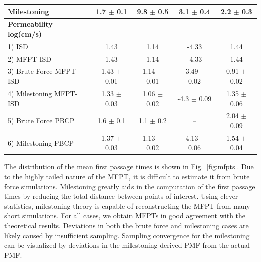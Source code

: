 \begin{table}[!htbp]
\begin{sideways}
\begin{tabular}{@{}lcccc@{}}
    Milestoning             & 1.7 $\pm$ 0.1\e{-2}           & 9.8 $\pm$ 0.5\e{-3}
                                    & 3.1 $\pm$ 0.4\e{-8}            & 2.2 $\pm$ 0.3\e{-2}     \\
    \bottomrule
    \textbf{Permeability log(cm/s)} & & & & \\\midrule
    1) ISD                  & 1.43            & 1.14             & -4.33            & 1.44           \\
    2) MFPT-ISD             & 1.43            & 1.14             & -4.33            & 1.44           \\
    3) Brute Force MFPT-ISD & 1.43 $\pm$ 0.01 & 1.14 $\pm$ 0.01  & -3.49 $\pm$ 0.02 & 0.91 $\pm$ 0.02\\
    4) Milestoning MFPT-ISD & 1.33 $\pm$ 0.03 & 1.06 $\pm$ 0.02  & -4.3 $\pm$ 0.09  & 1.35 $\pm$ 0.06\\
    5) Brute Force PBCP     & 1.6 $\pm$ 0.1   & 1.1 $\pm$ 0.2    & --               & 2.04 $\pm$ 0.09\\
    6) Milestoning PBCP     & 1.37 $\pm$ 0.03 & 1.13 $\pm$ 0.02  & -4.13 $\pm$ 0.06 & 1.54 $\pm$ 0.04\\
    \bottomrule
    \end{tabular}
\end{sideways}
\label{table:milepermresults}
\end{table}

    \par The distribution of the mean first passage times is shown in Fig.~\ref{fig:mfpts}. Due to the highly tailed nature of the MFPT, it is difficult to estimate it from brute force simulations. Milestoning greatly aids in the computation of the first passage times by reducing the total distance between points of interest. Using clever statistics, milestoning theory is capable of reconstructing the MFPT from many short simulations. For all cases, we obtain MFPTs in good agreement with the theoretical results. Deviations in both the brute force and milestoning cases are likely caused by insufficient sampling. Sampling convergence for the milestoning can be visualized by deviations in the milestoning-derived PMF from the actual PMF.

